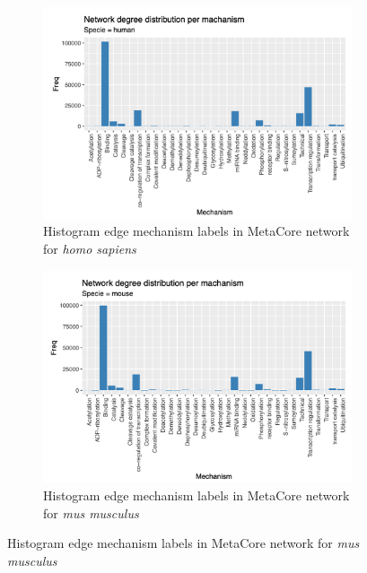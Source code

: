 \begin{figure}[!htbp]
    \begin{subfigure}{0.5\linewidth}
        \includegraphics[width=\textwidth, height=\textheight, keepaspectratio]{Major Thesis/figures/eda/Degree_human.png}
            \caption{Histogram edge mechanism labels in MetaCore network for \textit{homo sapiens}}
    \end{subfigure}
    \hfill
    \begin{subfigure}{0.5\linewidth}
        \includegraphics[width=\textwidth, height=\textheight, keepaspectratio]{Major Thesis/figures/eda/Degree_mice.png}
            \caption{Histogram edge mechanism labels in MetaCore network for \textit{mus musculus}}
    \end{subfigure}
    \label{img:suppl:degrees}
\end{figure}

